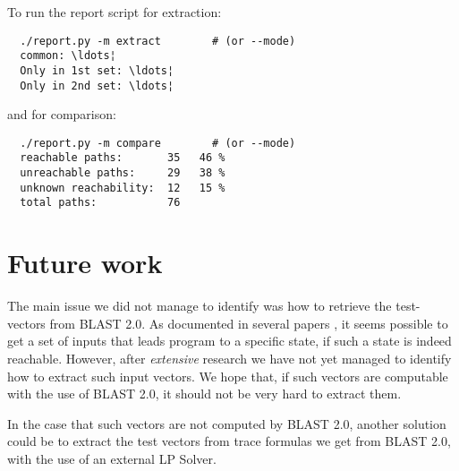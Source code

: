 \documentclass[a4paper, 11pt,twoside]{article}
\begin{document}
To run the report script for extraction:

\begin{verbatim} 
  ./report.py -m extract		# (or --mode)
  common: \ldots¦
  Only in 1st set: \ldots¦
  Only in 2nd set: \ldots¦
\end{verbatim}

and for comparison:

\begin{verbatim} 
  ./report.py -m compare 		# (or --mode)
  reachable paths:       35   46 %
  unreachable paths:   	 29   38 %
  unknown reachability:  12   15 %
  total paths:         	 76  
\end{verbatim}

\section{Future work}
The main issue we did not manage to identify was how to retrieve the test-vectors from BLAST 2.0. As documented in several papers \cite{Beyer2004} \cite{Beyer2007}, it seems possible to get a set of inputs that leads program to a specific state, if such a state is indeed reachable. However, after \emph{extensive} research we have not yet managed to identify how to extract such input vectors. We hope that, if such vectors are computable with the use of BLAST 2.0, it should not be very hard to extract them.

In the case that such vectors are not computed by BLAST 2.0, another solution could be to extract the test vectors from trace formulas we get from BLAST 2.0, with the use of an external LP Solver.


\end{document}
